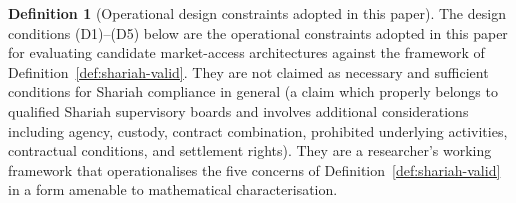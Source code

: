 \documentclass[preprint,12pt,authoryear]{elsarticle}
\theoremstyle{definition}
\newtheorem{definition}{Definition}[section]
\begin{document}
\begin{definition}[Operational design constraints adopted in this
    paper]
\label{def:compliant-arch}
The design conditions (D1)--(D5) below are the operational
constraints adopted in this paper for evaluating candidate
market-access architectures against the framework of
Definition~\ref{def:shariah-valid}. They are not claimed as
necessary and sufficient conditions for Shariah compliance in
general (a claim which properly belongs to qualified Shariah
supervisory boards and involves additional considerations
including agency, custody, contract combination, prohibited
underlying activities, contractual conditions, and settlement
rights). They are a researcher's working framework that
operationalises the five concerns of
Definition~\ref{def:shariah-valid} in a form amenable to
mathematical characterisation.


\end{definition}
\end{document}
